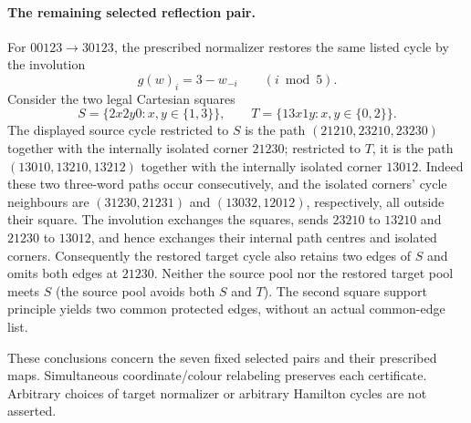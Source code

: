 \paragraph{The remaining selected reflection pair.}
For $00123\to30123$, the prescribed normalizer restores the
same listed cycle by the involution
\[
g(w)_i=3-w_{-i}\qquad(i\bmod5).
\]
Consider the two legal Cartesian squares
\[
S=\{2x2y0:x,y\in\{1,3\}\},\qquad
T=\{13x1y:x,y\in\{0,2\}\}.
\]
The displayed source cycle restricted to $S$ is the path
$(21210,23210,23230)$ together with the internally isolated
corner $21230$; restricted to $T$, it is the path
$(13010,13210,13212)$ together with the internally isolated
corner $13012$. Indeed these two three-word paths occur
consecutively, and the isolated corners' cycle neighbours are
$(31230,21231)$ and $(13032,12012)$, respectively, all outside
their square.
The involution exchanges the squares, sends $23210$ to $13210$
and $21230$ to $13012$, and hence exchanges their internal
path centres and isolated corners. Consequently the restored
target cycle also retains two edges of $S$ and omits both edges
at $21230$. Neither the source pool nor the restored target
pool meets $S$ (the source pool avoids both $S$ and $T$).
The second square support principle yields two common
protected edges, without an actual common-edge list.

These conclusions concern the seven fixed selected pairs and
their prescribed maps. Simultaneous coordinate/colour
relabeling preserves each certificate. Arbitrary choices of
target normalizer or arbitrary Hamilton cycles are not asserted.
